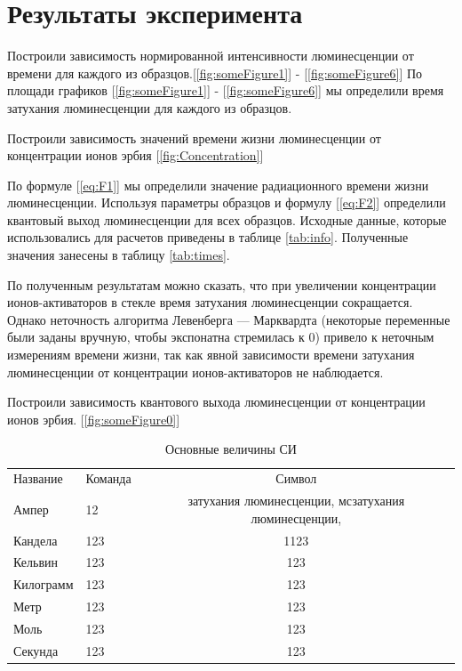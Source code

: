 \section{Результаты эксперимента}\label{sec:results}

Построили зависимость нормированной интенсивности
люминесценции от времени для каждого из образцов.[\ref{fig:someFigure1}] - [\ref{fig:someFigure6}]
По площади графиков [\ref{fig:someFigure1}] - [\ref{fig:someFigure6}] мы определили время затухания люминесценции для каждого из образцов.

Построили зависимость значений времени жизни люминесценции
от концентрации ионов эрбия [\ref{fig:Concentration}]

По формуле [\ref{eq:F1}] мы определили значение радиационного времени
жизни люминесценции.
Используя параметры образцов и формулу [\ref{eq:F2}] определили квантовый выход люминесценции для всех образцов.
Исходные данные, которые использовались для расчетов приведены в таблице \ref{tab:info}.
Полученные значения занесены в таблицу \ref{tab:times}.

По полученным результатам можно сказать, что при увеличении концентрации ионов-активаторов в стекле время затухания люминесценции сокращается.
Однако неточность алгоритма Левенберга — Марквардта (некоторые переменные были заданы вручную, чтобы экспонатна стремилась к 0) привело к неточным измерениям времени жизни,
так как явной зависимости времени затухания люминесценции от концентрации ионов-активаторов не наблюдается.

Построили зависимость квантового выхода люминесценции от концентрации ионов эрбия. [\ref{fig:someFigure0}]

\begin{table}
    \centering
	\begin{threeparttable}%
    \caption{Основные величины СИ}\label{tab:unit:base}
    \begin{tabular}{llc}
        Название  & Команда                 & Символ         \\
        Ампер     & 12 & затухания   люминесценции, мсзатухания   люминесценции,   \\
        Кандела   & 123 & 1123 \\
        Кельвин   & 123 & 123   \\
        Килограмм & 123 & 123 \\
        Метр      & 123 & 123    \\
        Моль      & 123 & 123     \\
        Секунда   & 123 & 123   \\
    \end{tabular}
	\end{threeparttable}
\end{table}

